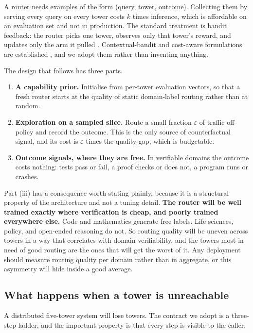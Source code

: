 \documentclass[11pt]{article}
\begin{document}
A router needs examples of the form (query, tower, outcome). Collecting them by serving every query on every tower costs $k$ times inference, which is affordable on an evaluation set and not in production. The standard treatment is bandit feedback: the router picks one tower, observes only that tower's reward, and updates only the arm it pulled \cite{banditrouting2025}. Contextual-bandit and cost-aware formulations are established \cite{banditrouting2025,routingsurvey2026}, and we adopt them rather than inventing anything.

The design that follows has three parts.

\begin{enumerate}[label=(\roman*),itemsep=3pt]
\item \textbf{A capability prior.} Initialise from per-tower evaluation vectors, so that a fresh router starts at the quality of static domain-label routing rather than at random.
\item \textbf{Exploration on a sampled slice.} Route a small fraction $\varepsilon$ of traffic off-policy and record the outcome. This is the only source of counterfactual signal, and its cost is $\varepsilon$ times the quality gap, which is budgetable.
\item \textbf{Outcome signals, where they are free.} In verifiable domains the outcome costs nothing: tests pass or fail, a proof checks or does not, a program runs or crashes.
\end{enumerate}

Part (iii) has a consequence worth stating plainly, because it is a structural property of the architecture and not a tuning detail. \textbf{The router will be well trained exactly where verification is cheap, and poorly trained everywhere else.} Code and mathematics generate free labels. Life sciences, policy, and open-ended reasoning do not. So routing quality will be uneven across towers in a way that correlates with domain verifiability, and the towers most in need of good routing are the ones that will get the worst of it. Any deployment should measure routing quality per domain rather than in aggregate, or this asymmetry will hide inside a good average.

\subsection{What happens when a tower is unreachable}
\label{sec:unreachable}

A distributed five-tower system will lose towers. The contract we adopt is a three-step ladder, and the important property is that every step is visible to the caller:
\end{document}

